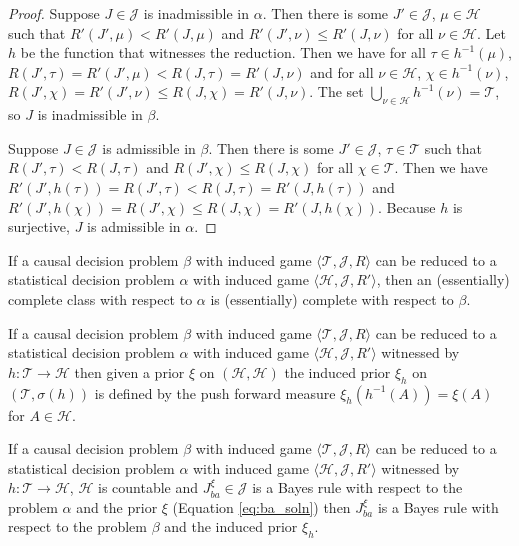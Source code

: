 \begin{proof}
Suppose $J\in\mathscr{J}$ is inadmissible in $\alpha$. Then there is some $J'\in\mathscr{J}$, $\mu\in\mathscr{H}$ such that $R'(J',\mu)<R'(J,\mu)$ and $R'(J',\nu)\leq R'(J,\nu)$ for all $\nu\in \mathscr{H}$. Let $h$ be the function that witnesses the reduction. Then we have for all $\tau\in h^{-1}(\mu)$, $R(J',\tau)=R'(J',\mu)<R(J,\tau)=R'(J,\nu)$ and for all $\nu\in \mathscr{H}$, $\chi\in h^{-1}(\nu)$, $R(J',\chi)=R'(J',\nu)\leq R(J,\chi)=R'(J,\nu)$. The set $\bigcup_{\nu\in\mathscr{H}} h^{-1}(\nu)=\mathscr{T}$, so $J$ is inadmissible in $\beta$.

Suppose $J\in \mathscr{J}$ is admissible in $\beta$. Then there is some $J'\in\mathscr{J}$, $\tau\in\mathscr{T}$ such that $R(J',\tau)<R(J,\tau)$ and $R(J',\chi)\leq R(J,\chi)$ for all $\chi\in \mathscr{T}$. Then we have $R'(J',h(\tau))=R(J',\tau)<R(J,\tau)=R'(J,h(\tau))$ and $R'(J',h(\chi))=R(J',\chi)\leq R(J,\chi)=R'(J,h(\chi))$. Because $h$ is surjective, $J$ is admissible in $\alpha$.
\end{proof}

\begin{corollary}\label{cor:red_comp}
If a causal decision problem $\beta$ with induced game $\langle \mathscr{T},\mathscr{J}, R\rangle$ can be reduced to a statistical decision problem $\alpha$ with induced game $\langle \mathscr{H},\mathscr{J},R' \rangle$, then an (essentially) complete class with respect to $\alpha$ is (essentially) complete with respect to $\beta$.
\end{corollary}

\begin{definition}
If a causal decision problem $\beta$ with induced game $\langle \mathscr{T},\mathscr{J}, R\rangle$ can be reduced to a statistical decision problem $\alpha$ with induced game $\langle \mathscr{H},\mathscr{J},R' \rangle$ witnessed by $h:\mathscr{T}\to\mathscr{H}$ then given a prior $\xi$ on $(\mathscr{H},\mathcal{H})$ the induced prior $\xi_h$ on $(\mathscr{T},\sigma(h))$ is defined by the push forward measure $\xi_h(h^{-1}(A)) = \xi(A)$ for $A\in \mathcal{H}$.
\end{definition}

\begin{lemma}\label{lem:IB_rule}
If a causal decision problem $\beta$ with induced game $\langle \mathscr{T},\mathscr{J}, R\rangle$ can be reduced to a statistical decision problem $\alpha$ with induced game $\langle \mathscr{H},\mathscr{J},R' \rangle$ witnessed by $h:\mathscr{T}\to\mathscr{H}$, $\mathscr{H}$ is countable and $J_{ba}^\xi\in \mathscr{J}$ is a Bayes rule with respect to the problem $\alpha$ and the prior $\xi$ (Equation \ref{eq:ba_soln}) then $J_{ba}^\xi$ is a Bayes rule with respect to the problem $\beta$ and the induced prior $\xi_h$.
\end{lemma}

